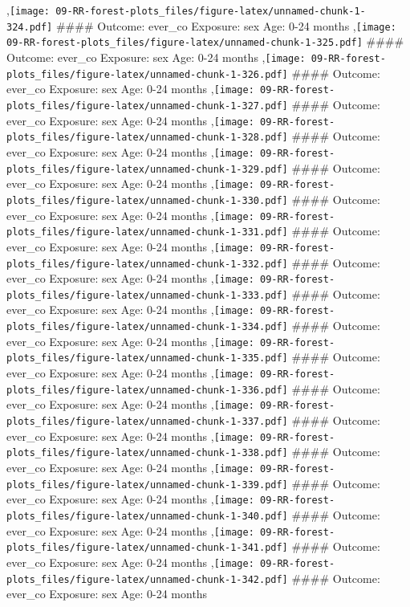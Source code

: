 \documentclass[
  9pt,
]{book}
\begin{document}
,\texttt{[image: 09-RR-forest-plots\_files/figure-latex/unnamed-chunk-1-324.pdf]}
\#\#\#\# Outcome: ever\_co Exposure: sex Age: 0-24 months
,\texttt{[image: 09-RR-forest-plots\_files/figure-latex/unnamed-chunk-1-325.pdf]}
\#\#\#\# Outcome: ever\_co Exposure: sex Age: 0-24 months
,\texttt{[image: 09-RR-forest-plots\_files/figure-latex/unnamed-chunk-1-326.pdf]}
\#\#\#\# Outcome: ever\_co Exposure: sex Age: 0-24 months
,\texttt{[image: 09-RR-forest-plots\_files/figure-latex/unnamed-chunk-1-327.pdf]}
\#\#\#\# Outcome: ever\_co Exposure: sex Age: 0-24 months
,\texttt{[image: 09-RR-forest-plots\_files/figure-latex/unnamed-chunk-1-328.pdf]}
\#\#\#\# Outcome: ever\_co Exposure: sex Age: 0-24 months
,\texttt{[image: 09-RR-forest-plots\_files/figure-latex/unnamed-chunk-1-329.pdf]}
\#\#\#\# Outcome: ever\_co Exposure: sex Age: 0-24 months
,\texttt{[image: 09-RR-forest-plots\_files/figure-latex/unnamed-chunk-1-330.pdf]}
\#\#\#\# Outcome: ever\_co Exposure: sex Age: 0-24 months
,\texttt{[image: 09-RR-forest-plots\_files/figure-latex/unnamed-chunk-1-331.pdf]}
\#\#\#\# Outcome: ever\_co Exposure: sex Age: 0-24 months
,\texttt{[image: 09-RR-forest-plots\_files/figure-latex/unnamed-chunk-1-332.pdf]}
\#\#\#\# Outcome: ever\_co Exposure: sex Age: 0-24 months
,\texttt{[image: 09-RR-forest-plots\_files/figure-latex/unnamed-chunk-1-333.pdf]}
\#\#\#\# Outcome: ever\_co Exposure: sex Age: 0-24 months
,\texttt{[image: 09-RR-forest-plots\_files/figure-latex/unnamed-chunk-1-334.pdf]}
\#\#\#\# Outcome: ever\_co Exposure: sex Age: 0-24 months
,\texttt{[image: 09-RR-forest-plots\_files/figure-latex/unnamed-chunk-1-335.pdf]}
\#\#\#\# Outcome: ever\_co Exposure: sex Age: 0-24 months
,\texttt{[image: 09-RR-forest-plots\_files/figure-latex/unnamed-chunk-1-336.pdf]}
\#\#\#\# Outcome: ever\_co Exposure: sex Age: 0-24 months
,\texttt{[image: 09-RR-forest-plots\_files/figure-latex/unnamed-chunk-1-337.pdf]}
\#\#\#\# Outcome: ever\_co Exposure: sex Age: 0-24 months
,\texttt{[image: 09-RR-forest-plots\_files/figure-latex/unnamed-chunk-1-338.pdf]}
\#\#\#\# Outcome: ever\_co Exposure: sex Age: 0-24 months
,\texttt{[image: 09-RR-forest-plots\_files/figure-latex/unnamed-chunk-1-339.pdf]}
\#\#\#\# Outcome: ever\_co Exposure: sex Age: 0-24 months
,\texttt{[image: 09-RR-forest-plots\_files/figure-latex/unnamed-chunk-1-340.pdf]}
\#\#\#\# Outcome: ever\_co Exposure: sex Age: 0-24 months
,\texttt{[image: 09-RR-forest-plots\_files/figure-latex/unnamed-chunk-1-341.pdf]}
\#\#\#\# Outcome: ever\_co Exposure: sex Age: 0-24 months
,\texttt{[image: 09-RR-forest-plots\_files/figure-latex/unnamed-chunk-1-342.pdf]}
\#\#\#\# Outcome: ever\_co Exposure: sex Age: 0-24 months
\end{document}
